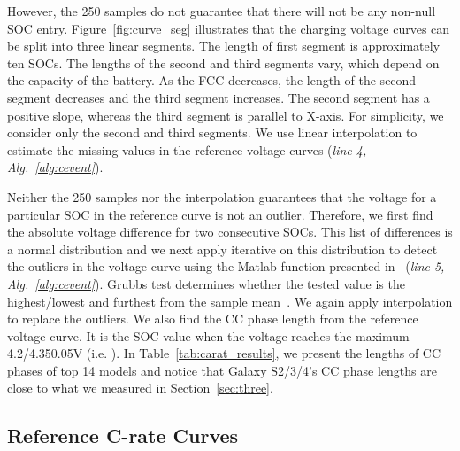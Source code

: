 \documentclass[journal]{IEEEtran}
\begin{document}
However, the 250 samples do not guarantee that there will not be any non-null SOC entry. Figure~\ref{fig:curve_seg} illustrates that the charging voltage curves can be split into three linear segments. The length of first segment is approximately ten SOCs. The lengths of the second and third segments vary, which depend on the capacity of the battery. As the FCC decreases, the length of the second segment decreases and the third segment increases. The second segment has a positive slope, whereas the third segment is parallel to X-axis. For simplicity, we consider only the second and third segments.  We use linear interpolation to estimate the missing values in the reference voltage curves (\textit{line 4, Alg.~\ref{alg:cevent}}). 

Neither the 250 samples nor the interpolation guarantees that the voltage for a particular SOC in the reference curve is not an outlier. Therefore, we first find the absolute voltage difference for two consecutive SOCs. This list of differences is a normal distribution and  we next apply iterative  on this distribution to detect the outliers in the voltage curve using the Matlab function presented in~\cite{matout} (\textit{line 5, Alg.~\ref{alg:cevent}}).  Grubbs test determines whether the tested value is the highest/lowest and furthest from the sample mean~\cite{doutlier}. We again apply interpolation to replace the outliers.  We also find the CC phase length from the reference voltage curve. It is the SOC value when the voltage reaches the maximum 4.2/4.350.05V  (i.e. ). In Table~\ref{tab:carat_results}, we present the lengths of CC phases of top 14 models and notice that Galaxy S2/3/4's CC phase lengths are close to what we measured in Section~\ref{sec:three}. 




\subsection{Reference C-rate Curves} 
\end{document}
